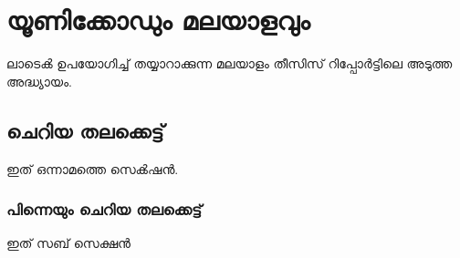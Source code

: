 \chapter{യൂണിക്കോഡും മലയാളവും}
ലാടെൿ ഉപയോഗിച്ച് തയ്യാറാക്കുന്ന മലയാളം തീസിസ് റിപ്പോർട്ടിലെ അടുത്ത അദ്ധ്യായം.

\section{ചെറിയ തലക്കെട്ട്}

ഇത് ഒന്നാമത്തെ സെൿഷൻ.

\subsection{പിന്നെയും ചെറിയ തലക്കെട്ട്}
ഇത് സബ് സെക്ഷൻ

 
